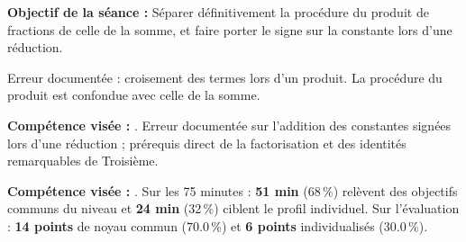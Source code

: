 \documentclass[10pt,a4paper]{article}
\begin{document}
\begin{goalbox}\textbf{Objectif de la séance :} Séparer définitivement la procédure du produit de fractions de celle de la somme, et faire porter le signe sur la constante lors d'une réduction.\end{goalbox}
Erreur documentée : croisement des termes lors d'un produit. La procédure du produit est confondue avec celle de la somme.
\par\vspace{1mm}\textbf{Compétence visée :} .
Erreur documentée sur l'addition des constantes signées lors d'une réduction ; prérequis direct de la factorisation et des identités remarquables de Troisième.
\par\vspace{1mm}\textbf{Compétence visée :} .
Sur les 75 minutes : \textbf{51 min} (68\,\%) relèvent des objectifs communs du niveau et \textbf{24 min} (32\,\%) ciblent le profil individuel. Sur l'évaluation : \textbf{14 points} de noyau commun (70.0\,\%) et \textbf{6 points} individualisés (30.0\,\%).
\newpage{}
\end{document}

